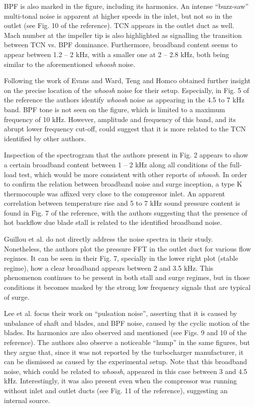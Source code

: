 BPF is also marked in the figure, including its harmonics. An intense ``buzz-saw'' multi-tonal noise is apparent at higher speeds in the inlet, but not so in the outlet (see Fig. 10 of the reference). TCN appears in the outlet duct as well. Mach number at the impeller tip is also highlighted as signalling the transition between TCN vs. BPF dominance. Furthermore, broadband content seems to appear between 1.2 -- 2 kHz, with a smaller one at 2 -- 2.8 kHz, both being similar to the aforementioned \emph{whoosh} noise.

Following the work of Evans and Ward, Teng and Homco \cite{teng2009investigation} obtained further insight on the precise location of the \emph{whoosh} noise for their setup. Especially, in Fig. 5 of the reference the authors identify \emph{whoosh} noise as appearing in the 4.5 to 7 kHz band. BPF tone is not seen on the figure, which is limited to a maximum frequency of 10 kHz. However, amplitude and frequency of this band, and its abrupt lower frequency cut-off, could suggest that it is more related to the TCN identified by other authors. 

Inspection of the spectrogram that the authors present in Fig. 2 appears to show a certain broadband content between 1 -- 2 kHz along all conditions of the full-load test, which would be more consistent with other reports of \emph{whoosh}. In order to confirm the relation between broadband noise and surge inception, a type K thermocouple was affixed very close to the compressor inlet. An apparent correlation between temperature rise and 5 to 7 kHz sound pressure content is found in Fig. 7 of the reference, with the authors suggesting that the presence of hot backflow due blade stall is related to the identified broadband noise.

Guillou et al. \cite{guillou2010characterization} do not directly address the noise spectra in their study. Nonetheless, the authors plot the pressure FFT in the outlet duct for various flow regimes. It can be seen in their Fig. 7, specially in the lower right plot (stable regime), how a clear broadband appears between 2 and 3.5 kHz. This phenomenon continues to be present in both stall and surge regimes, but in those conditions it becomes masked by the strong low frequency signals that are typical of surge.

Lee et al. \cite{lee2011control} focus their work on ``pulsation noise'', asserting that it is caused by unbalance of shaft and blades, and BPF noise, caused by the cyclic motion of the blades. Its harmonics are also observed and mentioned (see Figs. 9 and 10 of the reference). The authors also observe a noticeable ``hump'' in the same figures, but they argue that, since it was not reported by the turbocharger manufacturer, it can be dismissed as caused by the experimental setup. Note that this broadband noise, which could be related to \emph{whoosh}, appeared in this case between 3 and 4.5 kHz. Interestingly, it was also present even when the compressor was running without inlet and outlet ducts (see Fig. 11 of the reference), suggesting an internal source.


